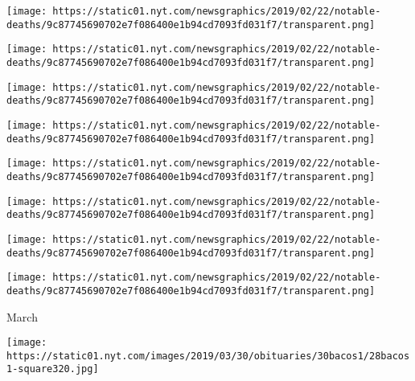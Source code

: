 \href{https://www.nytimes.com/2019/04/06/obituaries/ernest-hollings-dead.html}{}

\texttt{[image: https://static01.nyt.com/newsgraphics/2019/02/22/notable-deaths/9c87745690702e7f086400e1b94cd7093fd031f7/transparent.png]}

\href{https://www.nytimes.com/2019/04/06/obituaries/ly-tong-dead.html}{}

\texttt{[image: https://static01.nyt.com/newsgraphics/2019/02/22/notable-deaths/9c87745690702e7f086400e1b94cd7093fd031f7/transparent.png]}

\href{https://www.nytimes.com/2019/04/05/obituaries/dan-robbins-dead.html}{}

\texttt{[image: https://static01.nyt.com/newsgraphics/2019/02/22/notable-deaths/9c87745690702e7f086400e1b94cd7093fd031f7/transparent.png]}

\href{https://www.nytimes.com/2019/04/05/obituaries/kim-english-dead.html}{}

\texttt{[image: https://static01.nyt.com/newsgraphics/2019/02/22/notable-deaths/9c87745690702e7f086400e1b94cd7093fd031f7/transparent.png]}

\href{https://www.nytimes.com/2019/04/05/obituaries/sydney-brenner-dead.html}{}

\texttt{[image: https://static01.nyt.com/newsgraphics/2019/02/22/notable-deaths/9c87745690702e7f086400e1b94cd7093fd031f7/transparent.png]}

\href{https://www.nytimes.com/2019/04/05/obituaries/vonda-n-mcintyre-dead.html}{}

\texttt{[image: https://static01.nyt.com/newsgraphics/2019/02/22/notable-deaths/9c87745690702e7f086400e1b94cd7093fd031f7/transparent.png]}

\href{https://www.nytimes.com/2019/04/04/obituaries/a-rapper-who-came-back-for-his-neighborhood.html}{}

\texttt{[image: https://static01.nyt.com/newsgraphics/2019/02/22/notable-deaths/9c87745690702e7f086400e1b94cd7093fd031f7/transparent.png]}

\href{https://www.nytimes.com/2019/04/02/obituaries/charles-sanna-dead.html}{}

\texttt{[image: https://static01.nyt.com/newsgraphics/2019/02/22/notable-deaths/9c87745690702e7f086400e1b94cd7093fd031f7/transparent.png]}

March

\href{https://www.nytimes.com/2019/03/28/obituaries/michel-bacos-dead.html}{}

\texttt{[image: https://static01.nyt.com/images/2019/03/30/obituaries/30bacos1/28bacos1-square320.jpg]}

